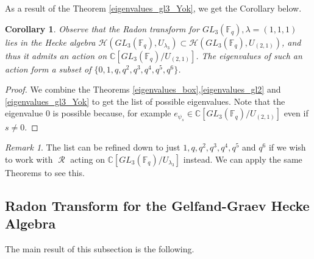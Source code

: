 \documentclass[12pt,reqno]{amsart}
\newtheorem{cor}[thm]{Corollary}
\newtheorem{prop}[thm]{Proposition}
\theoremstyle{definition}
\theoremstyle{remark}
\newtheorem{rem}[thm]{Remark}
\numberwithin{equation}{section}
\newcommand{\CC}{\mathbb{C}}
\newcommand{\GL}[1]{GL_{#1}(\mathbb{F}_q)}
\DeclareMathOperator{\R}{\mathcal{R}}
\def\IM#1{\textcolor[rgb]{0.00,0.00,0.75}{[I: #1]}}
\begin{document}
As a result of the Theorem \ref{eigenvalues_gl3_Yok}, we get the Corollary below.\\

\begin{cor}\label{1_1_1}
    Observe that the Radon transform for $\GL{3},\lambda=(1,1,1)$ lies in the Hecke algebra $\mathcal{H}(\GL{3},U_{\lambda_3})\subset \mathcal{H}(\GL{3},U_{(2,1)})$, and thus it admits an action on $\CC[\GL{3}/U_{(2,1)}]$. The eigenvalues of such an action form a subset of $\{0,1,q,q^2,q^3,q^4,q^5,q^6\}$.
\end{cor}

\begin{proof}
    We combine the Theorems \ref{eigenvalues_box},\ref{eigenvalues_gl2} and \ref{eigenvalues_gl3_Yok} to get the list of possible eigenvalues. Note that the eigenvalue $0$ is possible because, for example $e_{\psi_s}\in \CC[\GL{3}/U_{(2,1)}]$ even if $s\neq 0$.
\end{proof}

\begin{rem}
    The list can be refined down to just $1,q,q^2,q^3,q^4,q^5$ and $q^6$ if we wish to work with $\R$ acting on $\CC[\GL{3}/U_{\lambda_3}]$ instead. We can apply the same Theorems to see this.
\end{rem}


    





\subsection{Radon Transform for the Gelfand-Graev Hecke Algebra}
The main result of this subsection is the following.\\
\end{document}
